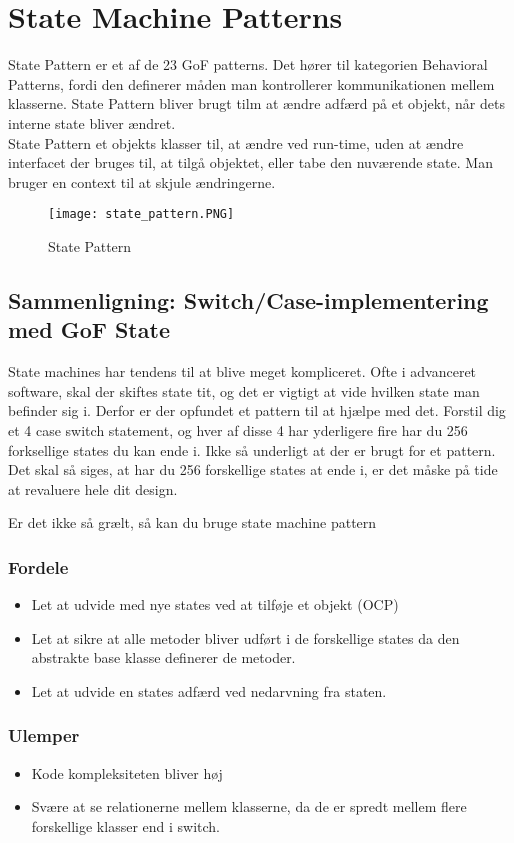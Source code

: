 \documentclass[../SWD_disp.tex]{subfiles}
\begin{document}
\section{State Machine Patterns}
State Pattern er et af de 23 GoF patterns. Det hører til kategorien Behavioral Patterns, fordi den definerer måden man kontrollerer kommunikationen mellem klasserne. State Pattern bliver brugt tilm at ændre adfærd på et objekt, når dets interne state bliver ændret.
\\

State Pattern et objekts klasser til, at ændre ved run-time, uden at ændre interfacet der bruges til, at tilgå objektet, eller tabe den nuværende state. Man bruger en context til at skjule ændringerne.

\begin{figure}[H]
    \centering
    \texttt{[image: state\_pattern.PNG]}
    \caption{State Pattern}
    \label{fig:state_pattern}
\end{figure}

\subsection{Sammenligning: Switch/Case-implementering med GoF State}
State machines har tendens til at blive meget kompliceret. Ofte i advanceret software, skal der skiftes state tit, og det er vigtigt at vide hvilken state man befinder sig i. Derfor er der opfundet et pattern til at hjælpe med det. 
Forstil dig et 4 case switch statement, og hver af disse 4 har yderligere fire har du 256 forksellige states du kan ende i.
Ikke så underligt at der er brugt for et pattern. Det skal så siges, at har du 256 forskellige states at ende i, er det måske på tide at revaluere hele dit design.

Er det ikke så grælt, så kan du bruge state machine pattern

\subsubsection*{Fordele}
\begin{itemize}
    \item Let at udvide med nye states ved at tilføje et objekt (OCP)
    \item Let at sikre at alle metoder bliver udført i de forskellige states da den abstrakte base klasse definerer de metoder.
    \item Let at udvide en states adfærd ved nedarvning fra staten.
\end{itemize}

\subsubsection{Ulemper}
\begin{itemize}
    \item Kode kompleksiteten bliver høj
    \item Svære at se relationerne mellem klasserne, da de er spredt mellem flere forskellige klasser end i switch.
\end{itemize}
\end{document}
